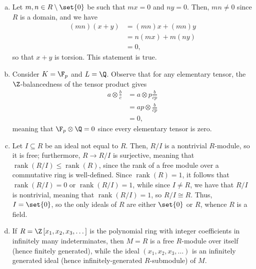 \documentclass[10pt]{mypackage}
\begin{document}
\begin{solution}\hfill
  \begin{enumerate}[(a)]
    \item Let $m,n\in R\setminus \set{0}$ be such that $mx = 0$ and $ny = 0$. Then, $mn\neq 0$ since $R$ is a domain, and we have
      \begin{align*}
        \left( mn \right)\left( x+y \right) &= \left( mn \right)x + \left( mn \right)y\\
                                            &= n\left( mx \right) + m\left( ny \right)\\
                                            &= 0,
      \end{align*}
      so that $x + y$ is torsion. This statement is true.
    \item Consider $K = \F_p$ and $L = \Q$. Observe that for any elementary tensor, the $\Z$-balancedness of the tensor product gives
      \begin{align*}
        a\otimes \frac{b}{c} &= a\otimes p\frac{b}{cp}\\
                             &= ap\otimes \frac{b}{cp}\\
                             &= 0,
      \end{align*}
      meaning that $\F_p\otimes \Q = 0$ since every elementary tensor is zero.
    \item Let $I\subseteq R$ be an ideal not equal to $R$. Then, $R/I$ is a nontrivial $R$-module, so it is free; furthermore, $R\rightarrow R/I$ is surjective, meaning that $\operatorname{rank}\left( R/I \right) \leq \operatorname{rank}\left( R \right)$, since the rank of a free module over a commutative ring is well-defined. Since $\operatorname{rank}\left( R \right) = 1$, it follows that $\operatorname{rank}\left( R/I \right) = 0$ or $\operatorname{rank}\left( R/I \right) = 1$, while since $I\neq R$, we have that $R/I$ is nontrivial, meaning that $\operatorname{rank}\left( R/I \right) = 1$, so $R/I\cong R$. Thus, $I = \set{0}$, so the only ideals of $R$ are either $\set{0}$ or $R$, whence $R$ is a field.
    \item If $R = \Z\left[ x_1,x_2,x_3,\dots \right]$ is the polynomial ring with integer coefficients in infinitely many indeterminates, then $M = R$ is a free $R$-module over itself (hence finitely generated), while the ideal $\left( x_1,x_2,x_3,\dots \right)$ is an infinitely generated ideal (hence infinitely-generated $R$-submodule) of $M$.
  \end{enumerate}
\end{solution}
\end{document}
